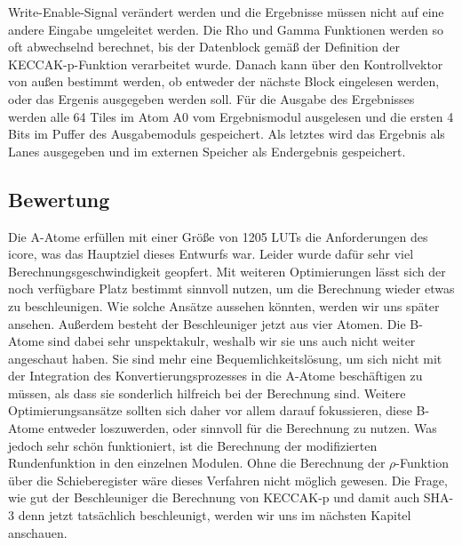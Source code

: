 Write-Enable-Signal verändert werden und die Ergebnisse müssen nicht auf eine andere Eingabe umgeleitet werden.
Die Rho und Gamma Funktionen werden so oft abwechselnd berechnet, bis der Datenblock gemäß der Definition der KECCAK-p-Funktion verarbeitet wurde.
Danach kann über den Kontrollvektor von außen bestimmt werden, ob entweder der nächste Block eingelesen werden, oder das Ergenis ausgegeben werden soll.
Für die Ausgabe des Ergebnisses werden alle 64 Tiles im Atom A0 vom Ergebnismodul ausgelesen und die ersten 4 Bits im Puffer des Ausgabemoduls gespeichert.
Als letztes wird das Ergebnis als Lanes ausgegeben und im externen Speicher als Endergebnis gespeichert.

\subsection{Bewertung}
Die A-Atome erfüllen mit einer Größe von 1205 LUTs die Anforderungen des icore, was das Hauptziel dieses Entwurfs war.
Leider wurde dafür sehr viel Berechnungsgeschwindigkeit geopfert. Mit weiteren Optimierungen lässt sich der noch verfügbare Platz
bestimmt sinnvoll nutzen, um die Berechnung wieder etwas zu beschleunigen. Wie solche Ansätze aussehen könnten, werden wir uns später
ansehen. Außerdem besteht der Beschleuniger jetzt aus vier Atomen. Die B-Atome sind dabei sehr unspektakulr, weshalb wir sie uns auch
nicht weiter angeschaut haben. Sie sind mehr eine Bequemlichkeitslösung, um sich nicht mit der Integration des Konvertierungsprozesses
in die A-Atome beschäftigen zu müssen, als dass sie sonderlich hilfreich bei der Berechnung sind. Weitere Optimierungsansätze sollten
sich daher vor allem darauf fokussieren, diese B-Atome entweder loszuwerden, oder sinnvoll für die Berechnung zu nutzen.
Was jedoch sehr schön funktioniert, ist die Berechnung der modifizierten Rundenfunktion in den einzelnen Modulen.
Ohne die Berechnung der $\rho$-Funktion über die Schieberegister wäre dieses Verfahren nicht möglich gewesen.
Die Frage, wie gut der Beschleuniger die Berechnung von KECCAK-p und damit auch SHA-3 denn jetzt tatsächlich beschleunigt,
werden wir uns im nächsten Kapitel anschauen.